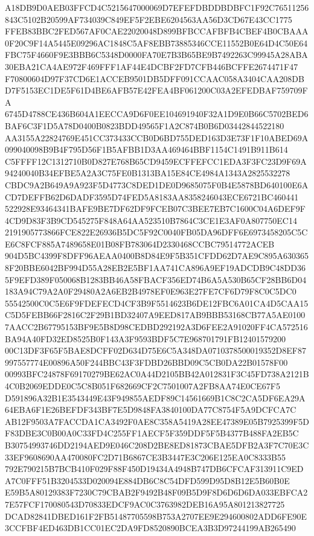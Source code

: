 \documentclass[UTF8,fontset=fandol,zihao=-4,a4paper]{ctexart}
\begin{document}
{{A18DB9D0AEB03FFCD4C5215647000069D7EFEFDBDDBDBFC1F92C76511256843C5102B20599AF734039C849EF5F2EBE6204563AA56D3CD67E43CC1775
FFEB83BBC2FED567AF0CAE22020048D899BFBCCAFBFB4CBEF4B0CBAAA0F20C9F14A5445E09296AC1848C5AF8EBB73885346CCE11552B0E64D4C50E64
FBC75F4660F9E3BBB6C5348D0000FA70E7B3B65BE9B7492263C99945A28ABA30EBA21CA4AE972F469FFF1AF44E4DCBF2FD7CFB446BCFFE2674471F47
F70800604D97F37CD6E1ACCEB9501DB5DFF091CCAAC058A3404CAA208DBD7F5153EC1DE5F61D4BE6AFB57E42FEA4BF061200C03A2EFEDBAF759709FA
6745D4788CE436B604A1EECCA9D6F0EE104691940F32A1D9E0B66C5702BED6BAF6C3F1D5A78D0400B0823BDD49565F1A2C874B0B6D03442844522180
AA3155A22824769E451CC373433CCB0D6BD755DED163D3E73F1F10ABED69A099040098B9B4F795D56F1B5AFBB1D3AA469464BBF1154C1491B911B614
C5FFFF12C1312710B0D827E768B65CD9459ECFFEFCC1EDA3F3FC23D9F69A94240040B34EFBE5A2A3C75FE0B1313BA15E84CE4984A1343A2825532278
CBDC9A2B649A9A923F5D4773C8DED1DE0D9685075F0B4E5878BD640100E6ACD7DEFFB62D6DADF3595D74FED5A8183AA8358246043ECE6721BC460441
522928E93464341BAFE9BE7DF62DF9FCEB07C3BEE7EB7C1600C04A6DEF9F4CD9D83F3B9CD545275F848A64AA523510B7864C3CE1E3AF0A807750EC14
2191905773866FCE822E26936B5DC5F92C0040FB05DA96DFF6E6973458205C5CE6C8FCF885A7489658E01B08FB783064D2330468CCBC79514772ACEB
904D5BC4399F8DFF96AEAA0400B8D84E9F5B351CFDD62D7AE9C895A6303658F20BBE6042BF994D55A28EB2E5BF1AA741CA896A9EF19ADCDB9C48DD36
5F9EFD389F050068B1283BB46A58FBACF356ED74B6A5A530B65CF28BB6D04183A94C79A2A0F29480A2A6EB2B4978EF0E963E27FE7CF6D79F8C0C5DC0
55542500C0C5E6F9FDEFECD4CF3B9F5514623B6DE12FBC6A01CA4D5CAA15C5D5FEBB66F2816C2F29B1BD32407A9EED817AB9BBB53168CB77A5AE0100
7AACC2B67795153BF9E5B8D98CEDBD292192A3D6FEE2A91020FF4CA572516BA94A40FD32ED8525B0F143A3F9593BDF5C7E968701791FB12401579200
00C13DF3F65F5BAE8DCFF02D634D75E6C5A348DA0710378500019352D8EF87997557774E00896A50F244BBC43F3FDBD26BBD09C5CB0DA22B01578F00
00993BFC24878F69170279BE62AC0A44D2105BB42A012831F3C45FD738A2121B4C0B2069EDDE0C5C8B051F682669CF2C7501007A2FB8AA74E0CE67F5
D591896A32B1E3543449E43F949855AEDF89C14561669B1C8C2CA5DF6EA29A64EBA6F1E26BEFDF343BF7E5D9848FA3840100DA77C8754F5A9DCFCA7C
AB12F9503A7FACCDA1CA3492F0AE8C358A5419A28EE47389E05B7925399F5DF83DBE3C0B00A0C33FD4C255FF1AECF5F359DDF5F5B4377B488FA2EB5C
B30754993746DD2194AED9E046C208D2BE8ED81873CBAE5DFB2A3F7C70E3C33EF9608690AA470080FC2D71B6867CE3B3447E3C206E125EA0C8333B55
792E790215B7BCB410F029F88F450D19434A4948B747DB6CFCAF313911C9EDA7C0FFF51B3204533D020094E884DB6C8C54DFD599D95D8B12E5B60B0E
E59B5A80129383F7230C79CBAB2F9492B48F09B5D9F8D6D6D6DA033EBFCA27E57FCF170080543D70833EDCF9AC0C3763982DEB16A95A801213827725
DCAD82841DBED161F2FB51487705598B753A2707EE9E294600802ADD6FE90E3CCFBF4ED463DB1CC01EC2DA9FD8520890BCEA3B3D97244199AB265490
}}
\end{document}
